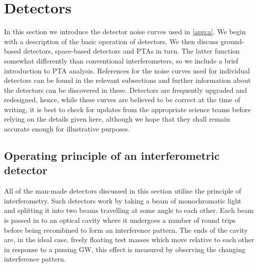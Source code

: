 \section{Detectors}\label{sec:detectors}

In this section we introduce the detector noise curves used in \ref{app:a}. We begin with a description of the basic operation of detectors. We then discuss ground-based detectors, space-based detectors and PTAs in turn. The latter function somewhat differently than conventional interferometers, so we include a brief introduction to PTA analysis. References for the noise curves used for individual detectors can be found in the relevant subsections and further information about the detectors can be discovered in these. Detectors are frequently upgraded and redesigned, hence, while these curves are believed to be correct at the time of writing, it is best to check for updates from the appropriate science teams before relying on the details given here, although we hope that they shall remain accurate enough for illustrative purposes.

\subsection{Operating principle of an interferometric detector}\label{sec:principles}

All of the man-made detectors discussed in this section utilise the principle of interferometry. Such detectors work by taking a beam of monochromatic light and splitting it into two beams travelling at some angle to each other. Each beam is passed in to an optical cavity where it undergoes a number of round trips before being recombined to form an interference pattern. The ends of the cavity are, in the ideal case, freely floating test masses which move relative to each other in response to a passing GW, this effect is measured by observing the changing interference pattern.

